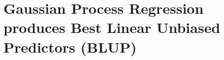 \section{Gaussian Process Regression produces Best Linear Unbiased Predictors (BLUP)}
\label{app:blup}

